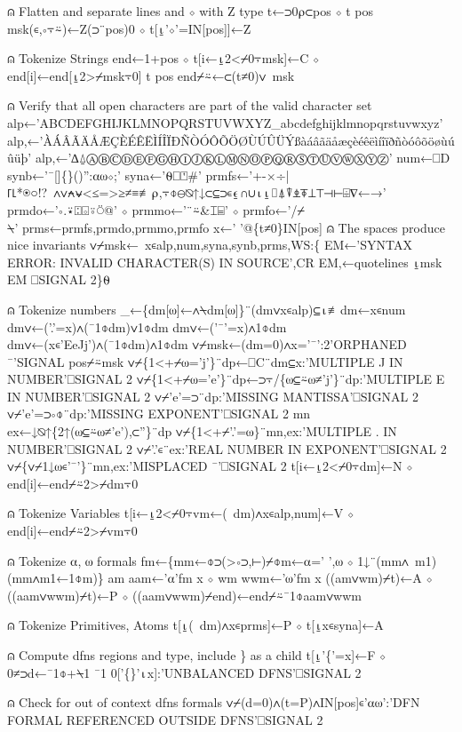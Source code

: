\documentclass{article}%
\begin{document}
⍝ Flatten and separate lines and ⋄ with Z type
         t←⊃0⍴⊂pos ⋄ t pos msk(∊,∘⍪⍨)←Z(⊃¨pos)0 ⋄ t[⍸'⋄'=IN[pos]]←Z

⍝ Tokenize Strings
         end←1+pos ⋄ t[i←⍸2<⌿0⍪msk]←C ⋄ end[i]←end[⍸2>⌿msk⍪0]
         t pos end⌿⍨←⊂(t≠0)∨~msk

⍝ Verify that all open characters are part of the valid character set
         alp←'ABCDEFGHIJKLMNOPQRSTUVWXYZ_abcdefghijklmnopqrstuvwxyz'
         alp,←'ÀÁÂÃÄÅÆÇÈÉÊËÌÍÎÏÐÑÒÓÔÕÖØÙÚÛÜÝßàáâãäåæçèéêëìíîïðñòóôõöøùúûüþ'
         alp,←'∆⍙ⒶⒷⒸⒹⒺⒻⒼⒽⒾⒿⓀⓁⓂⓃⓄⓅⓆⓇⓈⓉⓊⓋⓌⓍⓎⓏ'
         num←⎕D
         synb←'¯[]\{\}()'':⍺⍵⋄;'
         syna←'⍬⎕⍞#'
         prmfs←'+-×÷|⌈⌊*⍟○!?~∧∨⍲⍱<≤=>≥≠≡≢⍴,⍪⌽⊖⍉↑↓⊂⊆⊃∊⍷∩∪⍳⍸⌷⍋⍒⍎⍕⊥⊤⊣⊢⌹∇←→'
         prmdo←'∘.⍣⍠⌺⍤⍥@' ⋄ prmmo←'¨⍨&⌶⌸' ⋄ prmfo←'/⌿\\⍀'
         prms←prmfs,prmdo,prmmo,prmfo
         x←' '@\{t≠0\}IN[pos] ⍝ The spaces produce nice invariants
         ∨⌿msk←~x∊alp,num,syna,synb,prms,WS:\{
                 EM←'SYNTAX ERROR: INVALID CHARACTER(S) IN SOURCE',CR
                 EM,←quotelines ⍸msk
                 EM ⎕SIGNAL 2\}⍬

⍝ Tokenize numbers
         _←\{dm[⍵]←∧⍀dm[⍵]\}¨(dm∨x∊alp)⊆⍳≢dm←x∊num
         dm∨←('.'=x)∧(¯1⌽dm)∨1⌽dm
         dm∨←('¯'=x)∧1⌽dm
         dm∨←(x∊'EeJj')∧(¯1⌽dm)∧1⌽dm
         ∨⌿msk←(dm=0)∧x='¯':2'ORPHANED ¯'SIGNAL pos⌿⍨msk
         ∨⌿\{1<+⌿⍵='j'\}¨dp←⎕C¨dm⊆x:'MULTIPLE J IN NUMBER'⎕SIGNAL 2
         ∨⌿\{1<+⌿⍵='e'\}¨dp←⊃⍪/\{⍵⊆⍨⍵≠'j'\}¨dp:'MULTIPLE E IN NUMBER'⎕SIGNAL 2
         ∨⌿'e'=⊃¨dp:'MISSING MANTISSA'⎕SIGNAL 2
         ∨⌿'e'=⊃∘⌽¨dp:'MISSING EXPONENT'⎕SIGNAL 2
         mn ex←↓⍉↑\{2↑(⍵⊆⍨⍵≠'e'),⊂''\}¨dp
         ∨⌿\{1<+⌿'.'=⍵\}¨mn,ex:'MULTIPLE . IN NUMBER'⎕SIGNAL 2
         ∨⌿'.'∊¨ex:'REAL NUMBER IN EXPONENT'⎕SIGNAL 2
         ∨⌿\{∨⌿1↓⍵∊'¯'\}¨mn,ex:'MISPLACED ¯'⎕SIGNAL 2
         t[i←⍸2<⌿0⍪dm]←N ⋄ end[i]←end⌿⍨2>⌿dm⍪0

⍝ Tokenize Variables
         t[i←⍸2<⌿0⍪vm←(~dm)∧x∊alp,num]←V ⋄ end[i]←end⌿⍨2>⌿vm⍪0

⍝ Tokenize ⍺, ⍵ formals
         fm←\{mm←⌽⊃(>∘⊃,⊢)⌿⌽m←⍺=' ',⍵ ⋄ 1↓¨(mm∧~m1)(mm∧m1←1⌽m)\}
         am aam←'⍺'fm x ⋄ wm wwm←'⍵'fm x
         ((am∨wm)⌿t)←A ⋄ ((aam∨wwm)⌿t)←P ⋄ ((aam∨wwm)⌿end)←end⌿⍨¯1⌽aam∨wwm

⍝ Tokenize Primitives, Atoms
         t[⍸(~dm)∧x∊prms]←P ⋄ t[⍸x∊syna]←A

⍝ Compute dfns regions and type, include \} as a child
         t[⍸'\{'=x]←F ⋄ 0≠⊃d←¯1⌽+⍀1 ¯1 0['\{\}'⍳x]:'UNBALANCED DFNS'⎕SIGNAL 2

⍝ Check for out of context dfns formals
         ∨⌿(d=0)∧(t=P)∧IN[pos]∊'⍺⍵':'DFN FORMAL REFERENCED OUTSIDE DFNS'⎕SIGNAL 2
\end{document}
